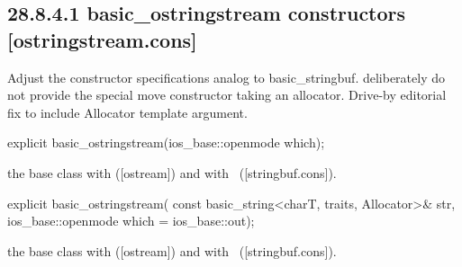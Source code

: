 \documentclass[ebook,11pt,article]{memoir}
\renewcommand{\iref}[1]{[#1]}
\begin{document}
\subsection{28.8.4.1 basic\_ostringstream constructors [ostringstream.cons]}

\begin{em}
Adjust the constructor specifications analog to basic_stringbuf. deliberately do not provide the special move constructor taking an allocator. Drive-by editorial fix to include Allocator template argument.
\end{em}

\begin{itemdecl}
explicit basic_ostringstream(ios_base::openmode which);
\end{itemdecl}

\begin{itemdescr}
\pnum
\effects
{} the base class with
(\iref{ostream})
and  with %
~(\iref{stringbuf.cons}).
\end{itemdescr}

%
\begin{itemdecl}
explicit basic_ostringstream(
  const basic_string<charT, traits, Allocator>& str,
  ios_base::openmode which = ios_base::out);
\end{itemdecl}

\begin{itemdescr}
\pnum
\effects
{} the base class with
(\iref{ostream})
and  with%
~(\iref{stringbuf.cons}).
\end{itemdescr}
\end{document}
